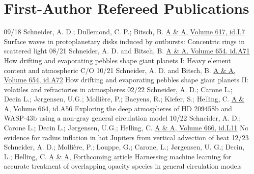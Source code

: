 \documentclass[]{friggeri-cv}
\begin{document}
\section{First-Author Refereed Publications}
\begin{entrylist}
  \entry
    {09/18}
    {Schneider, A. D.; Dullemond, C. P.; Bitsch, B.}
    {\href{https://arxiv.org/abs/1809.02834}{A \& A, Volume 617, id.L7}}
    {Surface waves in protoplanetary disks induced by outbursts: Concentric rings in scattered light}
  \entry
    {08/21}
    {Schneider, A. D. and Bitsch, B.}
    {\href{https://arxiv.org/abs/2105.13267}{A \& A, Volume 654, id.A71}}
    {How drifting and evaporating pebbles shape giant planets I: Heavy element content and atmospheric C/O}
  \entry
    {10/21}
    {Schneider, A. D. and Bitsch, B.}
	{\href{https://arxiv.org/abs/2109.03589}{A \& A, Volume 654, id.A72}}
    {How drifting and evaporating pebbles shape giant planets II: volatiles and refractories in atmospheres}
  \entry
    {02/22}
    {Schneider, A. D.; Carone L.; Decin L.; Jørgensen, U.G.; Mollière, P.; Baeyens, R.; Kiefer, S.; Helling, C.}
    {\href{https://arxiv.org/abs/2202.09183}{A \& A, Volume 664, id.A56}}
    {Exploring the deep atmospheres of HD 209458b and WASP-43b using a non-gray general circulation model}    
  \entry
    {10/22}
    {Schneider, A. D.; Carone L.; Decin L.; Jørgensen, U.G.; Helling, C.}
    {\href{https://arxiv.org/abs/2210.01466}{A \& A, Volume 666, id.L11}}
    {No evidence for radius inflation in hot Jupiters from vertical advection of heat}    
  \entry
  	{12/23}
    {Schneider, A. D.; Molli\`ere, P.; Louppe, G.; Carone, L.; J{\o}rgensen, U. G.; Decin, L.; Helling, C.}
    {\href{https://arxiv.org/abs/2311.00775}{A \& A, Forthcoming article}}
    {Harnessing machine learning for accurate treatment of overlapping opacity species in general circulation models}  
\end{entrylist}
\end{document}
